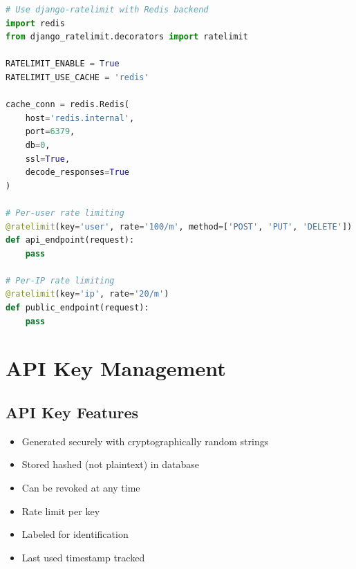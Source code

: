 \documentclass{report}
\begin{document}
\begin{lstlisting}[language=Python]
# Use django-ratelimit with Redis backend
import redis
from django_ratelimit.decorators import ratelimit

RATELIMIT_ENABLE = True
RATELIMIT_USE_CACHE = 'redis'

cache_conn = redis.Redis(
    host='redis.internal',
    port=6379,
    db=0,
    ssl=True,
    decode_responses=True
)

# Per-user rate limiting
@ratelimit(key='user', rate='100/m', method=['POST', 'PUT', 'DELETE'])
def api_endpoint(request):
    pass

# Per-IP rate limiting
@ratelimit(key='ip', rate='20/m')
def public_endpoint(request):
    pass
\end{lstlisting}

\section{API Key Management}

\subsection{API Key Features}
\begin{itemize}
\item Generated securely with cryptographically random strings
\item Stored hashed (not plaintext) in database
\item Can be revoked at any time
\item Rate limit per key
\item Labeled for identification
\item Last used timestamp tracked
\end{itemize}
\end{document}
